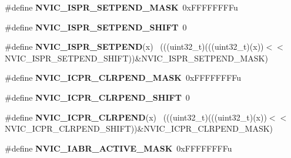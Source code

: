 \begin{DoxyCompactItemize}
\item 
\hypertarget{group___n_v_i_c___register___masks_ga0dfd5e3a045907297c9dd71464796792}{}\#define {\bfseries N\+V\+I\+C\+\_\+\+I\+S\+P\+R\+\_\+\+S\+E\+T\+P\+E\+N\+D\+\_\+\+M\+A\+S\+K}~0x\+F\+F\+F\+F\+F\+F\+F\+Fu\label{group___n_v_i_c___register___masks_ga0dfd5e3a045907297c9dd71464796792}

\item 
\hypertarget{group___n_v_i_c___register___masks_ga67398055aa260b7d62bdcb6c7e1aa202}{}\#define {\bfseries N\+V\+I\+C\+\_\+\+I\+S\+P\+R\+\_\+\+S\+E\+T\+P\+E\+N\+D\+\_\+\+S\+H\+I\+F\+T}~0\label{group___n_v_i_c___register___masks_ga67398055aa260b7d62bdcb6c7e1aa202}

\item 
\hypertarget{group___n_v_i_c___register___masks_ga482c043a170912b0f33d89a75f340fdc}{}\#define {\bfseries N\+V\+I\+C\+\_\+\+I\+S\+P\+R\+\_\+\+S\+E\+T\+P\+E\+N\+D}(x)                                      ~(((uint32\+\_\+t)(((uint32\+\_\+t)(x))$<$$<$N\+V\+I\+C\+\_\+\+I\+S\+P\+R\+\_\+\+S\+E\+T\+P\+E\+N\+D\+\_\+\+S\+H\+I\+F\+T))\&N\+V\+I\+C\+\_\+\+I\+S\+P\+R\+\_\+\+S\+E\+T\+P\+E\+N\+D\+\_\+\+M\+A\+S\+K)\label{group___n_v_i_c___register___masks_ga482c043a170912b0f33d89a75f340fdc}

\item 
\hypertarget{group___n_v_i_c___register___masks_ga16ce69a282193dc237cb2a889a314ad2}{}\#define {\bfseries N\+V\+I\+C\+\_\+\+I\+C\+P\+R\+\_\+\+C\+L\+R\+P\+E\+N\+D\+\_\+\+M\+A\+S\+K}~0x\+F\+F\+F\+F\+F\+F\+F\+Fu\label{group___n_v_i_c___register___masks_ga16ce69a282193dc237cb2a889a314ad2}

\item 
\hypertarget{group___n_v_i_c___register___masks_ga6391b14d641916849bb245233f7689c2}{}\#define {\bfseries N\+V\+I\+C\+\_\+\+I\+C\+P\+R\+\_\+\+C\+L\+R\+P\+E\+N\+D\+\_\+\+S\+H\+I\+F\+T}~0\label{group___n_v_i_c___register___masks_ga6391b14d641916849bb245233f7689c2}

\item 
\hypertarget{group___n_v_i_c___register___masks_ga2bb3c4fb6a79c518df75a22d9cb1b256}{}\#define {\bfseries N\+V\+I\+C\+\_\+\+I\+C\+P\+R\+\_\+\+C\+L\+R\+P\+E\+N\+D}(x)                                      ~(((uint32\+\_\+t)(((uint32\+\_\+t)(x))$<$$<$N\+V\+I\+C\+\_\+\+I\+C\+P\+R\+\_\+\+C\+L\+R\+P\+E\+N\+D\+\_\+\+S\+H\+I\+F\+T))\&N\+V\+I\+C\+\_\+\+I\+C\+P\+R\+\_\+\+C\+L\+R\+P\+E\+N\+D\+\_\+\+M\+A\+S\+K)\label{group___n_v_i_c___register___masks_ga2bb3c4fb6a79c518df75a22d9cb1b256}

\item 
\hypertarget{group___n_v_i_c___register___masks_gae64d55712faee5d6e852fcce362e8012}{}\#define {\bfseries N\+V\+I\+C\+\_\+\+I\+A\+B\+R\+\_\+\+A\+C\+T\+I\+V\+E\+\_\+\+M\+A\+S\+K}~0x\+F\+F\+F\+F\+F\+F\+F\+Fu\label{group___n_v_i_c___register___masks_gae64d55712faee5d6e852fcce362e8012}


\end{DoxyCompactItemize}
